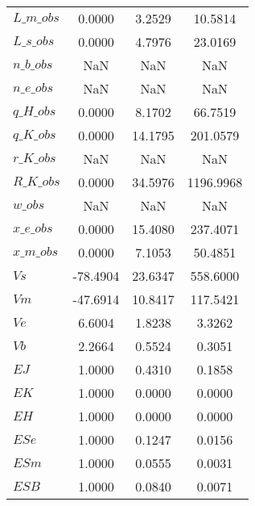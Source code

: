 \begin{center}
\begin{longtable}{lccc}
$L\_m\_obs                  $	 & 	       0.0000	 & 	       3.2529	 & 	      10.5814 \\ 
$L\_s\_obs                  $	 & 	       0.0000	 & 	       4.7976	 & 	      23.0169 \\ 
$n\_b\_obs                  $	 & 	          NaN	 & 	          NaN	 & 	          NaN \\ 
$n\_e\_obs                  $	 & 	          NaN	 & 	          NaN	 & 	          NaN \\ 
$q\_H\_obs                  $	 & 	       0.0000	 & 	       8.1702	 & 	      66.7519 \\ 
$q\_K\_obs                  $	 & 	       0.0000	 & 	      14.1795	 & 	     201.0579 \\ 
$r\_K\_obs                  $	 & 	          NaN	 & 	          NaN	 & 	          NaN \\ 
$R\_K\_obs                  $	 & 	       0.0000	 & 	      34.5976	 & 	    1196.9968 \\ 
$w\_obs                     $	 & 	          NaN	 & 	          NaN	 & 	          NaN \\ 
$x\_e\_obs                  $	 & 	       0.0000	 & 	      15.4080	 & 	     237.4071 \\ 
$x\_m\_obs                  $	 & 	       0.0000	 & 	       7.1053	 & 	      50.4851 \\ 
$Vs                         $	 & 	     -78.4904	 & 	      23.6347	 & 	     558.6000 \\ 
$Vm                         $	 & 	     -47.6914	 & 	      10.8417	 & 	     117.5421 \\ 
$Ve                         $	 & 	       6.6004	 & 	       1.8238	 & 	       3.3262 \\ 
$Vb                         $	 & 	       2.2664	 & 	       0.5524	 & 	       0.3051 \\ 
$EJ                         $	 & 	       1.0000	 & 	       0.4310	 & 	       0.1858 \\ 
$EK                         $	 & 	       1.0000	 & 	       0.0000	 & 	       0.0000 \\ 
$EH                         $	 & 	       1.0000	 & 	       0.0000	 & 	       0.0000 \\ 
$ESe                        $	 & 	       1.0000	 & 	       0.1247	 & 	       0.0156 \\ 
$ESm                        $	 & 	       1.0000	 & 	       0.0555	 & 	       0.0031 \\ 
$ESB                        $	 & 	       1.0000	 & 	       0.0840	 & 	       0.0071 \\ 

\end{longtable}
\end{center}
